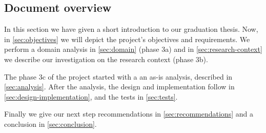 
\subsection{Document overview}
In this section we have given a short introduction to our graduation thesis.
Now, in \autoref{sec:objectives} we will depict the project's objectives and requirements.
We perform a domain analysis in \autoref{sec:domain} (phase 3a) and in \autoref{sec:research-context} we describe our investigation on the research context (phase 3b).

The phase 3c of the project started with a an as-is analysis, described in \autoref{sec:analysis}.
After the analysis, the design and implementation follow in \autoref{sec:design-implementation}, and the tests in \autoref{sec:tests}.

Finally we give our next step recommendations in \autoref{sec:recommendations} and a conclusion in \autoref{sec:conclusion}.